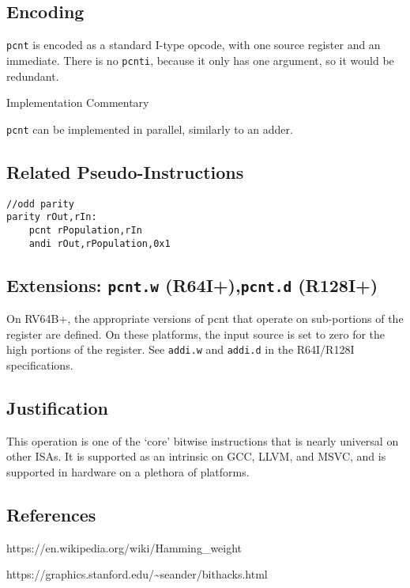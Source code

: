 \subsection{Encoding}



\texttt{pcnt} is encoded as a standard I-type opcode, with one source
register and an immediate. There is no \texttt{pcnti}, because it only
has one argument, so it would be redundant.

Implementation Commentary

\texttt{pcnt} can be implemented in parallel, similarly to an adder.

\subsection{Related Pseudo-Instructions}

\begin{verbatim}
//odd parity
parity rOut,rIn:
    pcnt rPopulation,rIn
    andi rOut,rPopulation,0x1
\end{verbatim}

\subsection{Extensions: \texttt{pcnt.w} (R64I+),\texttt{pcnt.d} (R128I+)}

On RV64B+, the appropriate versions of pcnt that operate on sub-portions
of the register are defined. On these platforms, the input source is set
to zero for the high portions of the register. See \texttt{addi.w} and
\texttt{addi.d} in the R64I/R128I specifications.

\subsection{Justification}

This operation is one of the `core' bitwise instructions that is nearly
universal on other ISAs. It is supported as an intrinsic on GCC, LLVM,
and MSVC, and is supported in hardware on a plethora of platforms.

\subsection{References}

https://en.wikipedia.org/wiki/Hamming\_weight

https://graphics.stanford.edu/\textasciitilde{}seander/bithacks.html

